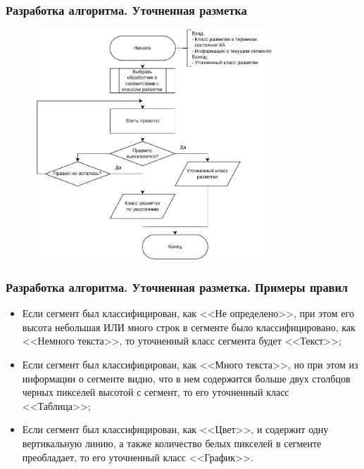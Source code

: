 \documentclass[gray]{beamer}
\begin{document}
\begin{frame}
    \frametitle{Разработка алгоритма. Уточненная разметка}
    \begin{figure}[H]
        \centering
        \includegraphics[width=0.8\textwidth]{diag/specified.pdf}
    \end{figure}
\end{frame}

\begin{frame}
    \frametitle{Разработка алгоритма. Уточненная разметка. Примеры правил}
    \begin{itemize}
        \item Если сегмент был классифицирован, как <<Не определено>>, при этом его высота небольшая ИЛИ много строк в сегменте было классифицировано, как <<Немного текста>>, то уточненный класс сегмента будет <<Текст>>;
        \item Если сегмент был классифицирован, как <<Много текста>>, но при этом из информации о сегменте видно, что в нем содержится больше двух столбцов черных пикселей высотой с сегмент, то его уточненный класс <<Таблица>>;
        \item Если сегмент был классифицирован, как <<Цвет>>, и содержит одну вертикальную линию, а также количество белых пикселей в сегменте преобладает, то его уточненный класс <<График>>.
    \end{itemize}
\end{frame}
\end{document}
